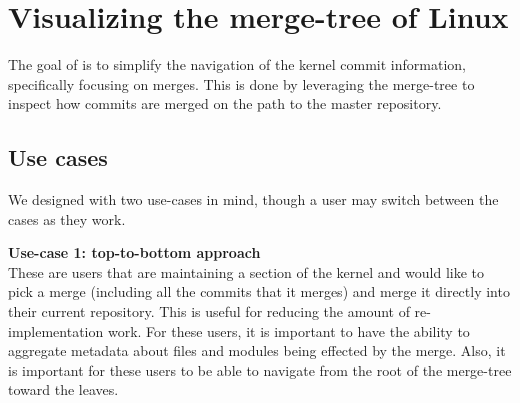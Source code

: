 \documentclass[draft]{IEEEtran}
\begin{document}
\title{\TheTitle}

\author{
        \IEEEauthorblockA{\TheAuthors}
}
\maketitle

\begin{abstract}

  

\end{abstract}


\begin{IEEEkeywords}
  \TheKeywords
\end{IEEEkeywords}



\label{sec:background}






\section{Visualizing the merge-tree of Linux}

The goal of \tool is to simplify the navigation of the kernel commit
information, specifically focusing on merges. This is done by leveraging
the merge-tree to inspect how commits are merged on the path to the
master repository.

\subsection{Use cases}

We designed \tool with two use-cases in mind, though a user may switch
between the cases as they work.

\noindent \textbf{Use-case 1: top-to-bottom
  approach}\label{sec:usecase1}\\ These are users that are maintaining a
section of the kernel and would like to pick a merge (including all the
commits that it merges) and merge it directly into their current
repository. This is useful for reducing the amount of re-implementation
work. For these users, it is important to have the ability to aggregate
metadata about files and modules being effected by the merge. Also, it
is important for these users to be able to navigate from the root of the
merge-tree toward the leaves.
\end{document}
